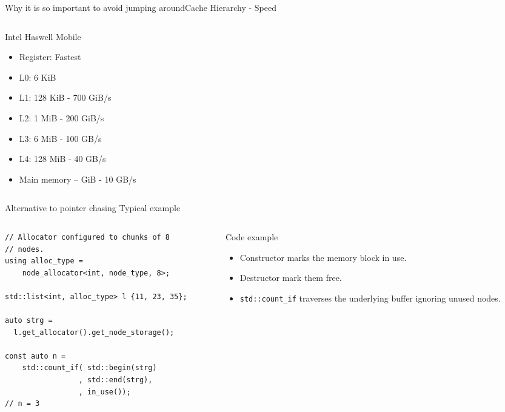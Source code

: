 \documentclass[10pt,aspectratio=169]{beamer}
\begin{document}
\begin{frame}{Why it is so important to avoid jumping around}{Cache Hierarchy - Speed}
\begin{columns}
        \begin{column}{0.3\textwidth}
          \begin{block} {Intel Haswell Mobile}
            \begin{itemize}
                \item Register: Fastest
                \item L0: 6 KiB
                \item L1: 128 KiB - 700 GiB/s
                \item L2: 1 MiB - 200 GiB/s
                \item L3: 6 MiB - 100 GB/s
                \item L4: 128 MiB - 40 GB/s
                \item Main memory – GiB - 10 GB/s
            \end{itemize}
          \end{block}
        \end{column}

    \end{columns}
\end{frame}

\begin{frame}[fragile]
{Alternative to pointer chasing}
{Typical example}
\begin{columns}
\begin{column}{0.47\textwidth}
\begin{lstlisting}
// Allocator configured to chunks of 8
// nodes.
using alloc_type =
    node_allocator<int, node_type, 8>;

std::list<int, alloc_type> l {11, 23, 35};

auto strg =
  l.get_allocator().get_node_storage();

const auto n =
    std::count_if( std::begin(strg)
                 , std::end(strg),
                 , in_use());
// n = 3
\end{lstlisting}

\end{column}
\begin{column}{0.47\textwidth}
\begin{block} {Code example}
\begin{itemize}
\item Constructor marks the memory block in use.
\item Destructor mark them free.
\item \texttt{std::count\_if} traverses the underlying buffer
ignoring unused nodes.
\end{itemize}
\end{block}
\end{column}
\end{columns}
\end{frame}
\end{document}
